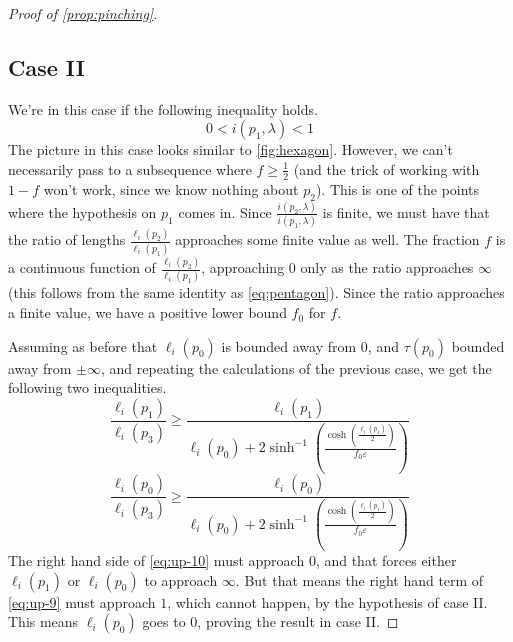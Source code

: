 \documentclass[12pt, reqno]{amsart}
\begin{document}
\begin{proof}[Proof of \autoref{prop:pinching}]
\subsection*{Case II}
We're in this case if the following inequality holds.
\begin{equation}
  \label{eq:up-8}
  0 < i(p_1, \lambda) < 1
\end{equation}
The picture in this case looks similar to \autoref{fig:hexagon}.
However, we can't necessarily pass to a subsequence where $f \geq \frac{1}{2}$ (and the trick of working with $1-f$ won't work, since we know nothing about $p_2$).
This is one of the points where the hypothesis on $p_1$ comes in.
Since $\frac{i(p_2, \lambda)}{i(p_1, \lambda)}$ is finite, we must have that the ratio of lengths $\frac{\ell_i(p_2)}{\ell_i(p_1)}$ approaches some finite value as well.
The fraction $f$ is a continuous function of $\frac{\ell_i(p_2)}{\ell_i(p_1)}$, approaching $0$ only as the ratio approaches $\infty$ (this follows from the same identity as \eqref{eq:pentagon}). Since the ratio approaches a finite value, we have a positive lower bound $f_0$ for $f$.

Assuming as before that $\ell_i(p_0)$ is bounded away from $0$, and $\tau(p_0)$ bounded away from $\pm \infty$, and repeating the calculations of the previous case, we get the following two inequalities.
\begin{equation}
  \label{eq:up-9}
  \frac{\ell_i(p_1)}{\ell_i(p_3)} \geq \frac{\ell_i(p_1) }{\ell_i(p_0) +
  2 \sinh^{-1} \left( \frac{\cosh\left( \frac{\ell_i(p_1)}{2} \right)}{f_0 \varepsilon} \right)
  }
\end{equation}
\begin{equation}
  \label{eq:up-10}
  \frac{\ell_i(p_0)}{\ell_i(p_3)} \geq \frac{\ell_i(p_0)}{\ell_i(p_0) +
  2 \sinh^{-1} \left( \frac{\cosh\left( \frac{\ell_i(p_1)}{2} \right)}{f_0 \varepsilon} \right)
  }
\end{equation}
The right hand side of \eqref{eq:up-10} must approach $0$, and that forces either $\ell_i(p_1)$ or $\ell_i(p_0)$ to approach $\infty$.
But that means the right hand term of \eqref{eq:up-9} must approach $1$, which cannot happen, by the hypothesis of case II.
This means $\ell_i(p_0)$ goes to $0$, proving the result in case II.


\end{proof}
\end{document}

